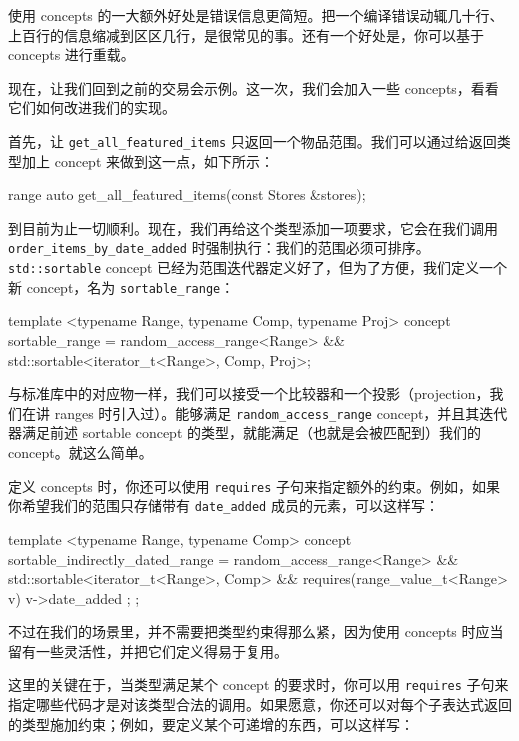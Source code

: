 使用 concepts 的一大额外好处是错误信息更简短。把一个编译错误动辄几十行、上百行的信息缩减到区区几行，是很常见的事。还有一个好处是，你可以基于 concepts 进行重载。

现在，让我们回到之前的交易会示例。这一次，我们会加入一些 concepts，看看它们如何改进我们的实现。

首先，让 \texttt{get\_\allowbreak{}all\_\allowbreak{}featured\_\allowbreak{}items} 只返回一个物品范围。我们可以通过给返回类型加上 concept 来做到这一点，如下所示：

\begin{codebox}[text]
range auto get_all_featured_items(const Stores &stores);
\end{codebox}

到目前为止一切顺利。现在，我们再给这个类型添加一项要求，它会在我们调用 \texttt{order\_\allowbreak{}items\_\allowbreak{}by\_\allowbreak{}date\_\allowbreak{}added} 时强制执行：我们的范围必须可排序。\texttt{std::\allowbreak{}sortable} concept 已经为范围迭代器定义好了，但为了方便，我们定义一个新 concept，名为 \texttt{sortable\_\allowbreak{}range}：

\begin{codebox}[cpp]
template <typename Range, typename Comp, typename Proj>
concept sortable_range =
    random_access_range<Range> && std::sortable<iterator_t<Range>, Comp, Proj>;
\end{codebox}

与标准库中的对应物一样，我们可以接受一个比较器和一个投影（projection，我们在讲 ranges 时引入过）。能够满足 \texttt{random\_\allowbreak{}access\_\allowbreak{}range} concept，并且其迭代器满足前述 sortable concept 的类型，就能满足（也就是会被匹配到）我们的 concept。就这么简单。

定义 concepts 时，你还可以使用 \texttt{requires} 子句来指定额外的约束。例如，如果你希望我们的范围只存储带有 \texttt{date\_\allowbreak{}added} 成员的元素，可以这样写：

\begin{codebox}[cpp]
template <typename Range, typename Comp>
concept sortable_indirectly_dated_range =
    random_access_range<Range> && std::sortable<iterator_t<Range>, Comp> && requires(range_value_t<Range> v) { { v->date_added }; };
\end{codebox}

不过在我们的场景里，并不需要把类型约束得那么紧，因为使用 concepts 时应当留有一些灵活性，并把它们定义得易于复用。

\label{idx:509}
这里的关键在于，当类型满足某个 concept 的要求时，你可以用 \texttt{requires} 子句来指定哪些代码才是对该类型合法的调用。如果愿意，你还可以对每个子表达式返回的类型施加约束；例如，要定义某个可递增的东西，可以这样写：

